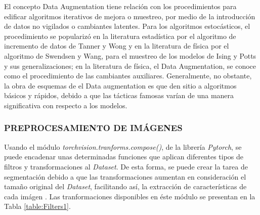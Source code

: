 			El concepto Data Augmentation tiene relación con los procedimientos para edificar algoritmos iterativos de mejora o muestreo, por medio de la introducción de datos no vigilados o cambiantes latentes. Para los algoritmos estocásticos, el procedimiento se popularizó en la literatura estadística por el algoritmo de incremento de datos de Tanner y Wong y en la literatura de física por el algoritmo de Swendsen y Wang, para el muestreo de los modelos de Ising y Potts y sus generalizaciones; en la literatura de física, el Data Augmentation, se conoce como el procedimiento de las cambiantes auxiliares. Generalmente, no obstante, la obra de esquemas de el Data augmentation es que den sitio a algoritmos básicos y rápidos, debido a que las tácticas famosas varían de una manera significativa con respecto a los modelos.\cite{van2001art}
					
			 
			\newpage
			\subsubsection{PREPROCESAMIENTO DE IMÁGENES}

			Usando el módulo \textit{torchvision.tranforms.compose()}, de la librería \textit{Pytorch}, se puede encadenar unas determinadas funciones que aplican diferentes tipos de filtros y transformaciones al \textit{Dataset}. De esta forma, se puede crear la tarea de segmentación debido a que las transformaciones aumentan en consideración el tamaño original del \textit{Dataset}, facilitando así, la extracción de características de cada imágen \cite{Pytorch}. Las tranformaciones disponibles en éste módulo se presentan en la Tabla \ref{table:Filters1}.
			
